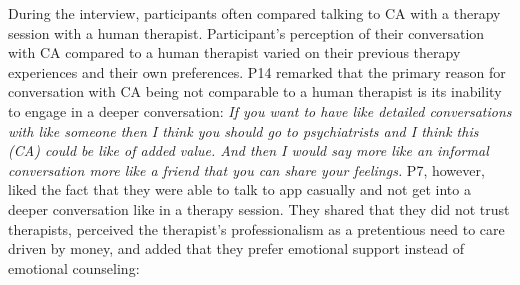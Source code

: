         During the interview, participants often compared talking to \ac{CA} with a therapy session with a human therapist.   
        Participant's perception of their conversation with \ac{CA} compared to a human therapist varied on their previous therapy experiences and their own preferences.
        P14 remarked that the primary reason for conversation with \ac{CA} being not comparable to a human therapist is its inability to engage in a deeper conversation:
                \textit{
                If you want to have like detailed conversations with like someone then I think you should go to psychiatrists and I think this (\ac{CA}) could be like of added value. And then I would say more like an informal conversation more like a friend that you can share your feelings.
                }
        P7, however, liked the fact that they were able to talk to \acl{app} casually and not get into a deeper conversation like in a therapy session. 
        They shared that they did not trust therapists, perceived the therapist's professionalism as a pretentious need to care driven by money, and added that they prefer emotional support instead of emotional counseling:
